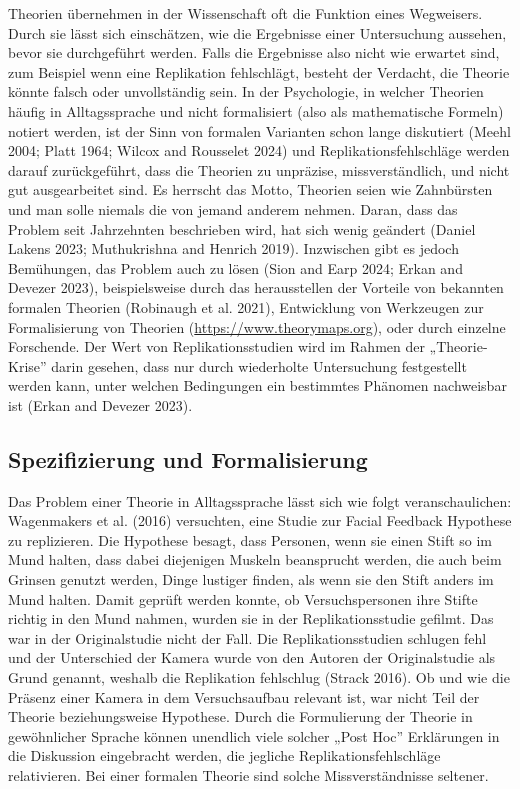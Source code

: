 \documentclass[
  letterpaper,
  DIV=11,
  numbers=noendperiod]{scrreprt}
\begin{document}
Theorien übernehmen in der Wissenschaft oft die Funktion eines
Wegweisers. Durch sie lässt sich einschätzen, wie die Ergebnisse einer
Untersuchung aussehen, bevor sie durchgeführt werden. Falls die
Ergebnisse also nicht wie erwartet sind, zum Beispiel wenn eine
Replikation fehlschlägt, besteht der Verdacht, die Theorie könnte falsch
oder unvollständig sein. In der Psychologie, in welcher Theorien häufig
in Alltagssprache und nicht formalisiert (also als mathematische
Formeln) notiert werden, ist der Sinn von formalen Varianten schon lange
diskutiert (Meehl 2004; Platt 1964; Wilcox and Rousselet 2024) und
Replikationsfehlschläge werden darauf zurückgeführt, dass die Theorien
zu unpräzise, missverständlich, und nicht gut ausgearbeitet sind. Es
herrscht das Motto, Theorien seien wie Zahnbürsten und man solle niemals
die von jemand anderem nehmen. Daran, dass das Problem seit Jahrzehnten
beschrieben wird, hat sich wenig geändert (Daniel Lakens 2023;
Muthukrishna and Henrich 2019). Inzwischen gibt es jedoch Bemühungen,
das Problem auch zu lösen (Sion and Earp 2024; Erkan and Devezer 2023),
beispielsweise durch das herausstellen der Vorteile von bekannten
formalen Theorien (Robinaugh et al. 2021), Entwicklung von Werkzeugen
zur Formalisierung von Theorien (\url{https://www.theorymaps.org}), oder
durch einzelne Forschende. Der Wert von Replikationsstudien wird im
Rahmen der „Theorie-Krise'' darin gesehen, dass nur durch wiederholte
Untersuchung festgestellt werden kann, unter welchen Bedingungen ein
bestimmtes Phänomen nachweisbar ist (Erkan and Devezer 2023).

\subsection{Spezifizierung und
Formalisierung}\label{spezifizierung-und-formalisierung}

Das Problem einer Theorie in Alltagssprache lässt sich wie folgt
veranschaulichen: Wagenmakers et al. (2016) versuchten, eine Studie zur
Facial Feedback Hypothese zu replizieren. Die Hypothese besagt, dass
Personen, wenn sie einen Stift so im Mund halten, dass dabei diejenigen
Muskeln beansprucht werden, die auch beim Grinsen genutzt werden, Dinge
lustiger finden, als wenn sie den Stift anders im Mund halten. Damit
geprüft werden konnte, ob Versuchspersonen ihre Stifte richtig in den
Mund nahmen, wurden sie in der Replikationsstudie gefilmt. Das war in
der Originalstudie nicht der Fall. Die Replikationsstudien schlugen fehl
und der Unterschied der Kamera wurde von den Autoren der Originalstudie
als Grund genannt, weshalb die Replikation fehlschlug (Strack 2016). Ob
und wie die Präsenz einer Kamera in dem Versuchsaufbau relevant ist, war
nicht Teil der Theorie beziehungsweise Hypothese. Durch die Formulierung
der Theorie in gewöhnlicher Sprache können unendlich viele solcher „Post
Hoc'' Erklärungen in die Diskussion eingebracht werden, die jegliche
Replikationsfehlschläge relativieren. Bei einer formalen Theorie sind
solche Missverständnisse seltener.
\end{document}
